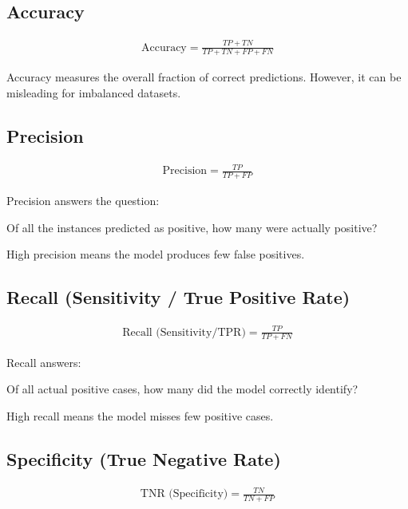 \documentclass[10pt,a4paper]{article}
\begin{document}
	\subsection{Accuracy}
	\begin{align*}
			\text{Accuracy} = \frac{TP+TN}{TP+TN+FP+FN}
	\end{align*}


	Accuracy measures the overall fraction of correct predictions.
	However, it can be misleading for imbalanced datasets.

	\subsection{Precision}
	\begin{align*}
			\text{Precision} = \frac{TP}{TP+FP}
	\end{align*}


	Precision answers the question:

	\begin{center}
		Of all the instances predicted as positive, how many were actually positive?
	\end{center}

	High precision means the model produces few false positives.

	\subsection{Recall (Sensitivity / True Positive Rate)}

	\begin{align*}
			\text{Recall (Sensitivity/TPR)} = \frac{TP}{TP+FN}
	\end{align*}


	Recall answers:

	\begin{center}
		Of all actual positive cases, how many did the model correctly identify?
	\end{center}

	High recall means the model misses few positive cases.

	\subsection{Specificity (True Negative Rate)}

	\begin{align*}
			\text{TNR (Specificity)} = \frac{TN}{TN+FP}
	\end{align*}
\end{document}
